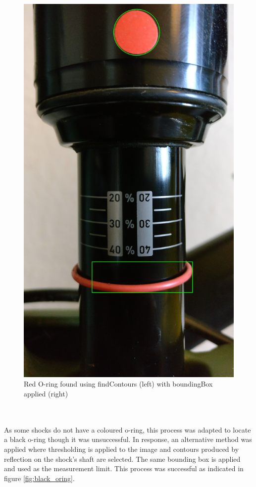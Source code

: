 \begin{figure}[h!]
\begin{minipage}{0.4\textwidth}
				\includegraphics[scale=0.1,
					trim={20cm 30cm 15cm 110cm},
					clip]{../images/results/raw_refs.jpg}				
			\end{minipage}\hfill
			\caption{Red O-ring found using {\ttfamily findContours} (left) with {\ttfamily boundingBox} applied (right)}
			\label{fig:find_oring}
		\end{figure}
		\\\\
		As some shocks do not have a coloured o-ring, this process was adapted to locate a black o-ring though it was unsuccessful. In response, an alternative method was applied where thresholding is applied to the image and contours produced by reflection on the shock's shaft are selected. The same bounding box is applied and used as the measurement limit. This process was successful as indicated in figure \ref{fig:black_oring}.
